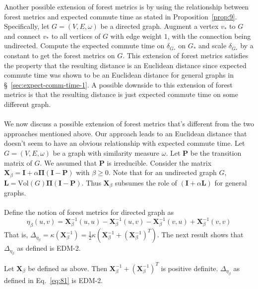 Another possible extension of forest metrics is by using the
relationship between forest metrics and expected commute time as
stated in Proposition~\ref{prop:9}. Specifically, let $G =
(V,E,\omega)$ be a directed graph. Augment a vertex $v_{*}$ to $G$ and
connect $v_{*}$ to all vertices of $G$ with edge weight $1$, with the
connection being undirected. Compute the expected commute time on
$\delta_{G_{*}}$ on $G_*$ and scale $\delta_{G_{*}}$ by a constant to
get the forest metrics on $G$. This extension of forest metrics
satisfies the property that the resulting distance is an Euclidean
distance since expected commute time was shown to be an Euclidean
distance for general graphs in \S~\ref{sec:expect-comm-time-1}. A
possible downside to this extension of forest metrics is that the
resulting distance is just expected commute time on some
different graph. \\ \\
%
%
\noindent 
We now discuss a possible extension of forest metrics that's different
from the two approaches mentioned above. Our approach leads to an
Euclidean distance that doesn't seem to have an obvious relationship
with expected commute time. Let $G = (V,E,\omega)$ be a graph with
similarity measure $\omega$. Let $\mathbf{P}$ be the transition matrix
of $G$. We assumed that $\mathbf{P}$ is irreducible. Consider the
matrix $\mathbf{X}_{\beta} = \mathbf{I} + \alpha \bm{\Pi}(\mathbf{I} -
\mathbf{P})$ with $\beta \geq 0$. Note that for an undirected graph
$G$, $\mathbf{L} = \mathrm{Vol}(G) \bm{\Pi}(\mathbf{I} -
\mathbf{P})$. Thus $\mathbf{X}_{\beta}$ subsumes the role of
$(\mathbf{I} + \alpha \mathbf{L})$ for general graphs. \\ \\
%
%
Define the notion of forest metrics for directed graph as
\begin{equation}
  \label{eq:81}
  \eta_{\beta}(u,v) = \mathbf{X}_\beta^{-1}(u,u) - \mathbf{X}_\beta^{-1}(u,v) -
  \mathbf{X}_\beta^{-1}(v,u) + \mathbf{X}_\beta^{-1}(v,v) 
\end{equation}
That is, $\Delta_{\eta_{\beta}} = \kappa(\mathbf{X}_\beta^{-1}) =
\tfrac{1}{2}\kappa(\mathbf{X}_\beta^{-1} +
(\mathbf{X}_{\beta}^{-1})^{T})$. The next result shows that
$\Delta_{\eta_{\beta}}$ as defined is EDM-2.
\begin{proposition}
  \label{prop:23}
  Let $\mathbf{X}_{\beta}$ be defined as above. Then
  $\mathbf{X}_{\beta}^{-1} + (\mathbf{X}_{\beta}^{-1})^{T}$ is
  positive definite. $\Delta_{\eta_{\beta}}$ as defined in
  Eq.~\eqref{eq:81} is EDM-2.
\end{proposition}
